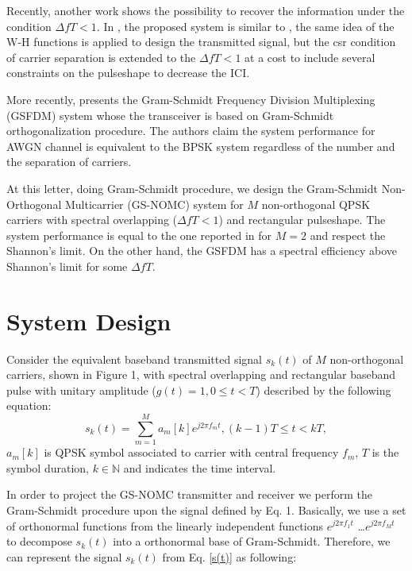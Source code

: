 \documentclass[twocolumn]{el-author}
\begin{document}
Recently, another work \cite{Fang} shows the possibility to recover the information under the condition $\Delta fT<1$. In \cite{Fang}, the proposed system is similar to \cite{Kozek}, the same idea of the W-H functions is applied to design the transmitted signal, but the csr condition of carrier separation is extended to the $\Delta fT<1$ at a cost to include several constraints on the pulseshape to decrease the ICI.

More recently, \cite{Zhang} presents the Gram-Schmidt Frequency Division Multiplexing (GSFDM) system whose the transceiver is based on Gram-Schmidt orthogonalization procedure. The authors claim the system performance for AWGN channel is equivalent to the BPSK system regardless of the number and the separation of carriers. 

At this letter, doing Gram-Schmidt procedure, we design the Gram-Schmidt Non-Orthogonal Multicarrier (GS-NOMC) system for $M$ non-orthogonal QPSK carriers with spectral overlapping
($\Delta fT<1$) and rectangular pulseshape. The system performance is equal to the one reported in \cite{Lucena} for $M=2$ and respect the Shannon's limit. On the other hand, the GSFDM has a spectral efficiency above Shannon's limit for some $\Delta fT$.
\vspace{-22,5pt}
\section{System Design}
Consider the equivalent baseband transmitted signal $s_k(t)$ of $M$ non-orthogonal carriers, shown in Figure 1, with spectral overlapping and  rectangular baseband pulse with unitary amplitude ($g(t)=1, 0\leq t<T$) described by the following equation:
\vspace{-5pt}
\begin{equation}\label{s(t)}
s_k(t)=\sum_{m=1}^{M}a_m[k]e^{j2\pi f_mt}, (k-1)T \leq t<kT, 
\end{equation}
$a_m[k]$  is QPSK symbol associated to carrier with central frequency $f_m$, $T$ is the symbol duration, $k \in \mathbb{N}$ and indicates the time interval. 

In order to project the GS-NOMC transmitter and receiver we perform the Gram-Schmidt procedure upon the signal defined by Eq. 1. Basically, we use a set of orthonormal functions from the linearly independent functions $e^{j2\pi f_1t}$ \ldots $e^{j2\pi f_Mt}$ \cite{Zhang} to decompose $s_k(t)$ into a orthonormal base of Gram-Schmidt.  Therefore, we can represent the signal $s_k(t)$ from Eq. \ref{s(t)} as following:
\end{document}
